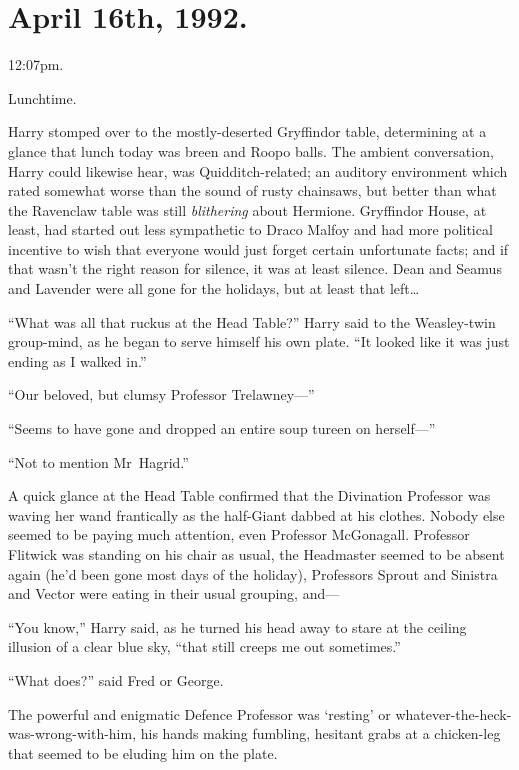 
\section{April 16th, 1992.}

12:07pm.

Lunchtime.

Harry stomped over to the mostly-deserted Gryffindor table, determining at a
glance that lunch today was breen and Roopo balls. The ambient conversation,
Harry could likewise hear, was Quidditch-related; an auditory environment which
rated somewhat worse than the sound of rusty chainsaws, but better than what
the Ravenclaw table was still \emph{blithering} about Hermione. Gryffindor
House, at least, had started out less sympathetic to Draco Malfoy and had more
political incentive to wish that everyone would just forget certain unfortunate
facts; and if that wasn’t the right reason for silence, it was at least
silence. Dean and Seamus and Lavender were all gone for the holidays, but at
least that left…

“What was all that ruckus at the Head Table?” Harry said to the Weasley-twin
group-mind, as he began to serve himself his own plate. “It looked like it was
just ending as I walked in.”

“Our beloved, but clumsy Professor Trelawney—”

“Seems to have gone and dropped an entire soup tureen on herself—”

“Not to mention Mr~Hagrid.”

A quick glance at the Head Table confirmed that the Divination Professor was
waving her wand frantically as the half-Giant dabbed at his clothes. Nobody
else seemed to be paying much attention, even Professor McGonagall. Professor
Flitwick was standing on his chair as usual, the Headmaster seemed to be absent
again (he’d been gone most days of the holiday), Professors Sprout and Sinistra
and Vector were eating in their usual grouping, and—

“You know,” Harry said, as he turned his head away to stare at the ceiling
illusion of a clear blue sky, “that still creeps me out sometimes.”

“What does?” said Fred or George.

The powerful and enigmatic Defence Professor was ‘resting’ or
whatever-the-heck-was-wrong-with-him, his hands making fumbling, hesitant grabs
at a chicken-leg that seemed to be eluding him on the plate.

